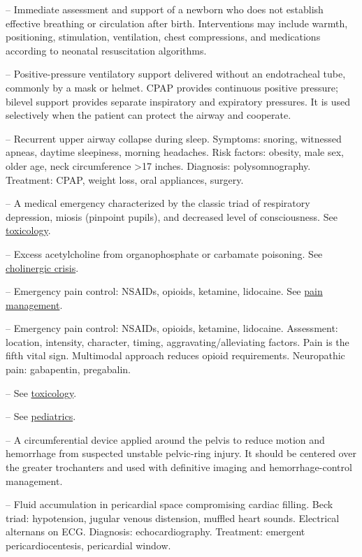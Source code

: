 -- Immediate assessment and support of a newborn who does not establish effective breathing or circulation after birth. Interventions may include warmth, positioning, stimulation, ventilation, chest compressions, and medications according to neonatal resuscitation algorithms.

-- Positive-pressure ventilatory support delivered without an endotracheal tube, commonly by a mask or helmet. CPAP provides continuous positive pressure; bilevel support provides separate inspiratory and expiratory pressures. It is used selectively when the patient can protect the airway and cooperate.

-- Recurrent upper airway collapse during sleep. Symptoms: snoring, witnessed apneas, daytime sleepiness, morning headaches. Risk factors: obesity, male sex, older age, neck circumference >17 inches. Diagnosis: polysomnography. Treatment: CPAP, weight loss, oral appliances, surgery.

-- A medical emergency characterized by the classic triad of respiratory depression, miosis (pinpoint pupils), and decreased level of consciousness. See \hyperlink{Toxicology}{toxicology}.

-- Excess acetylcholine from organophosphate or carbamate poisoning. See \hyperlink{Cholinergic Crisis}{cholinergic crisis}.

-- Emergency pain control: NSAIDs, opioids, ketamine, lidocaine. See \hyperlink{Pain Management}{pain management}.

-- Emergency pain control: NSAIDs, opioids, ketamine, lidocaine. Assessment: location, intensity, character, timing, aggravating/alleviating factors. Pain is the fifth vital sign. Multimodal approach reduces opioid requirements. Neuropathic pain: gabapentin, pregabalin.

-- See \hyperlink{Toxicology}{toxicology}.

-- See \hyperlink{Pediatrics}{pediatrics}.

-- A circumferential device applied around the pelvis to reduce motion and hemorrhage from suspected unstable pelvic-ring injury. It should be centered over the greater trochanters and used with definitive imaging and hemorrhage-control management.

-- Fluid accumulation in pericardial space compromising cardiac filling. Beck triad: hypotension, jugular venous distension, muffled heart sounds. Electrical alternans on ECG. Diagnosis: echocardiography. Treatment: emergent pericardiocentesis, pericardial window.

